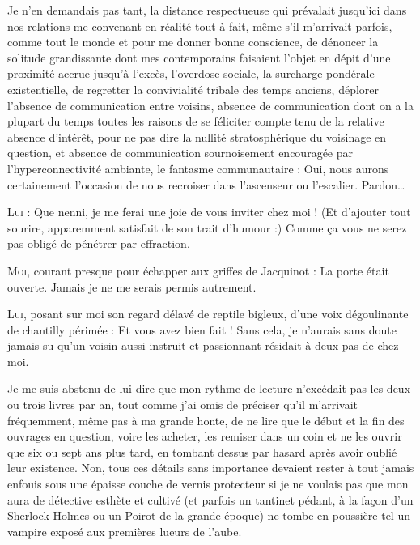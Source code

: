 Je n’en demandais pas tant, la distance respectueuse qui prévalait jusqu’ici dans nos relations me convenant en réalité tout à fait, même s’il m’arrivait parfois, comme tout le monde et pour me donner bonne conscience, de dénoncer la solitude grandissante dont mes contemporains faisaient l’objet en dépit d’une proximité accrue jusqu’à l’excès, l’overdose sociale, la surcharge pondérale existentielle, de regretter la convivialité tribale des temps anciens, déplorer l’absence de communication entre voisins, absence de communication dont on a la plupart du temps toutes les raisons de se féliciter compte tenu de la relative absence d’intérêt, pour ne pas dire la nullité stratosphérique du voisinage en question, et absence de communication sournoisement encouragée par l’hyperconnectivité ambiante, le fantasme communautaire : Oui, nous aurons certainement l’occasion de nous recroiser dans l’ascenseur ou l’escalier. Pardon…

\begin{dialogue}
    
\textsc{Lui} : Que nenni, je me ferai une joie de vous inviter chez moi ! (Et d’ajouter tout sourire, apparemment satisfait de son trait d’humour :) Comme ça vous ne serez pas obligé de pénétrer par effraction.

\textsc{Moi}, courant presque pour échapper aux griffes de Jacquinot : La porte était ouverte. Jamais je ne me serais permis autrement.

\textsc{Lui}, posant sur moi son regard délavé de reptile bigleux, d’une voix dégoulinante de chantilly périmée : Et vous avez bien fait ! Sans cela, je n’aurais sans doute jamais su qu’un voisin aussi instruit et passionnant résidait à deux pas de chez moi.

\end{dialogue}
    
Je me suis abstenu de lui dire que mon rythme de lecture n’excédait pas les deux ou trois livres par an, tout comme j’ai omis de préciser qu’il m’arrivait fréquemment, même pas à ma grande honte, de ne lire que le début et la fin des ouvrages en question, voire les acheter, les remiser dans un coin et ne les ouvrir que six ou sept ans plus tard, en tombant dessus par hasard après avoir oublié leur existence. Non, tous ces détails sans importance devaient rester à tout jamais enfouis sous une épaisse couche de vernis protecteur si je ne voulais pas que mon aura de détective esthète et cultivé (et parfois un tantinet pédant, à la façon d’un Sherlock Holmes ou un Poirot de la grande époque) ne tombe en poussière tel un vampire exposé aux premières lueurs de l’aube.

